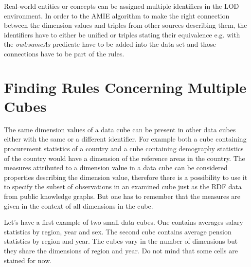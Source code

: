 Real-world entities or concepts can be assigned multiple identifiers in the LOD environment. In order to the AMIE algorithm to make the right connection between the dimension values and triples from other sources describing them, the identifiers have to either be unified or triples stating their equivalence e.g. with the \textit{owl:sameAs} predicate have to be added into the data set and those connections have to be part of the rules.

\section{Finding Rules Concerning Multiple Cubes\label{morecubes}}

The same dimension values of a data cube can be present in other data cubes either with the same or a different identifier. For example both a cube containing procurement statistics of a country and a cube containing demography statistics of the country would have a dimension of the reference areas in the country. The measures attributed to a dimension value in a data cube can be considered properties describing the dimension value, therefore there is a possibility to use it to specify the subset of observations in an examined cube just as the RDF data from public knowledge graphs. But one has to remember that the measures are given in the context of all dimensions in the cube. 

Let's have a first example of two small data cubes. One contains averages salary statistics by region, year and sex. The second cube contains average pension statistics by region and year. The cubes vary in the number of dimensions but they share the dimensions of region and year. Do not mind that some cells are stained for now.

